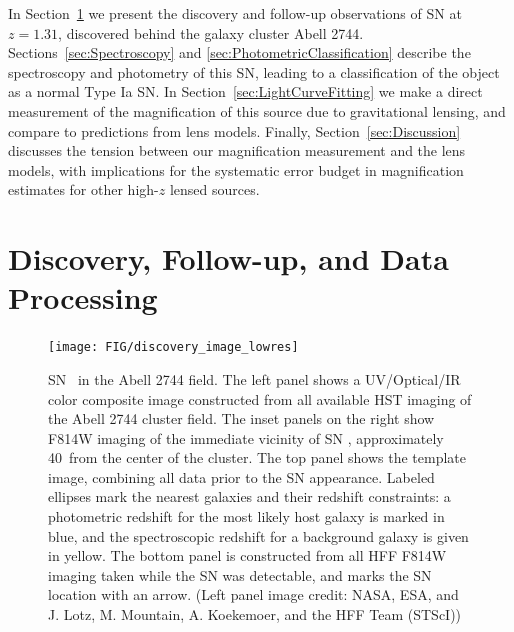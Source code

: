 In Section~\ref{sec:DiscoveryAndFollowup} we present the discovery and
follow-up observations of SN \tomas at $z=1.31$, discovered behind the
galaxy cluster Abell 2744.  Sections~\ref{sec:Spectroscopy}
and \ref{sec:PhotometricClassification} describe the spectroscopy and
photometry of this SN, leading to a classification of the object as a
normal Type Ia SN.  In Section~\ref{sec:LightCurveFitting} we make a
direct measurement of the magnification of this source due to
gravitational lensing, and compare to predictions from lens models.
Finally, Section~\ref{sec:Discussion} discusses the tension between
our magnification measurement and the lens models, with implications
for the systematic error budget in magnification estimates for other
high-$z$ lensed sources.


\section{Discovery, Follow-up, and Data Processing}
\label{sec:DiscoveryAndFollowup}

\begin{figure}
\begin{center}
\texttt{[image: FIG/discovery\_image\_lowres]}
\caption{  \label{fig:DiscoveryImage} 
SN \tomas\ in the Abell 2744 field.  The left panel shows a
UV/Optical/IR color composite image constructed from all available HST
imaging of the Abell 2744 cluster field.  The inset panels on the right
show F814W imaging of the immediate vicinity of SN \tomas,
approximately 40\arcsec\ from the center of the cluster. The top panel
shows the template image, combining all data prior to the SN
appearance.  Labeled ellipses mark the nearest galaxies and their
redshift constraints: a photometric redshift for the most likely host
galaxy is marked in blue, and the spectroscopic redshift for a
background galaxy is given in yellow. The bottom panel is constructed
from all HFF F814W imaging taken while the SN was detectable, and
marks the SN location with an arrow.  (Left panel image credit: NASA,
ESA, and J. Lotz, M. Mountain, A. Koekemoer, and the HFF Team (STScI))
}
\end{center}
\end{figure}


